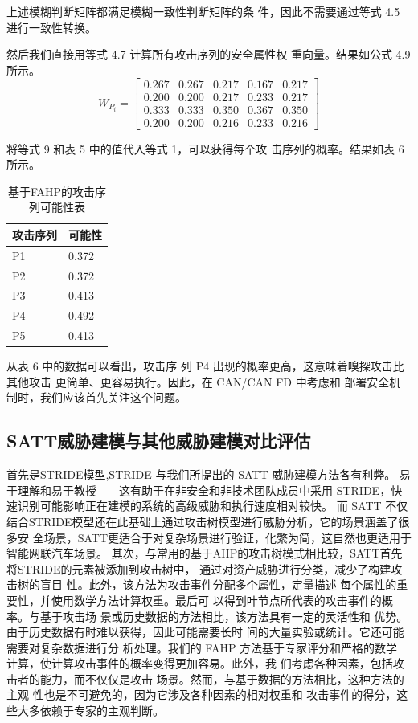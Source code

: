 上述模糊判断矩阵都满足模糊一致性判断矩阵的条
件，因此不需要通过等式 4.5 进行一致性转换。

然后我们直接用等式 4.7 计算所有攻击序列的安全属性权
重向量。结果如公式 4.9 所示。
\begin{equation}
    W_{P_i}=\left[\begin{array}{lllll}
    0.267 & 0.267 & 0.217 & 0.167 & 0.217 \\
    0.200 & 0.200 & 0.217 & 0.233 & 0.217 \\
    0.333 & 0.333 & 0.350 & 0.367 & 0.350 \\
    0.200 & 0.200 & 0.216 & 0.233 & 0.216
    \end{array}\right]
    \end{equation}

将等式 9 和表 5 中的值代入等式 1，可以获得每个攻
击序列的概率。结果如表 6 所示。
\begin{table}
  \caption{基于FAHP的攻击序列可能性表}
\begin{center}
    \begin{tabular}{|l|l}
      \hline 攻击序列 & 可能性 \\
      \hline P1 & 0.372 \\
      \hline P2 & 0.372 \\
      \hline P3 & 0.413 \\
      \hline P4 & 0.492 \\
      \hline P5 & 0.413 \\\hline
      \end{tabular}
  \end{center}
\end{table}
从表 6 中的数据可以看出，攻击序
列 P4 出现的概率更高，这意味着嗅探攻击比其他攻击
更简单、更容易执行。因此，在 CAN/CAN FD 中考虑和
部署安全机制时，我们应该首先关注这个问题。

\subsection{SATT威胁建模与其他威胁建模对比评估}
首先是STRIDE模型,STRIDE 与我们所提出的 SATT 威胁建模方法各有利弊。
易于理解和易于教授——这有助于在非安全和非技术团队成员中采用 STRIDE，快速识别可能影响正在建模的系统的高级威胁和执行速度相对较快。
而 SATT 不仅结合STRIDE模型还在此基础上通过攻击树模型进行威胁分析，它的场景涵盖了很多安
全场景，SATT更适合于对复杂场景进行验证，化繁为简，这自然也更适用于智能网联汽车场景。
其次，与常用的基于AHP的攻击树模式相比较，SATT首先将STRIDE的元素被添加到攻击树中，
通过对资产威胁进行分类，减少了构建攻击树的盲目
性。此外，该方法为攻击事件分配多个属性，定量描述
每个属性的重要性，并使用数学方法计算权重。最后可
以得到叶节点所代表的攻击事件的概率。与基于攻击场
景或历史数据的方法相比，该方法具有一定的灵活性和
优势。由于历史数据有时难以获得，因此可能需要长时
间的大量实验或统计。它还可能需要对复杂数据进行分
析处理。我们的 FAHP 方法基于专家评分和严格的数学
计算，使计算攻击事件的概率变得更加容易。此外，我
们考虑各种因素，包括攻击者的能力，而不仅仅是攻击
场景。然而，与基于数据的方法相比，这种方法的主观
性也是不可避免的，因为它涉及各种因素的相对权重和
攻击事件的得分，这些大多依赖于专家的主观判断。
